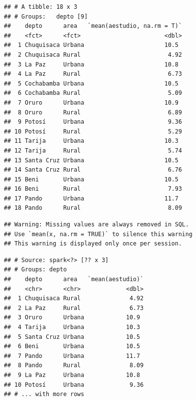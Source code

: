 \documentclass[
]{article}
\newenvironment{Shaded}{\begin{snugshade}}{\end{snugshade}}
\newcommand{\CommentTok}[1]{\textcolor[rgb]{0.56,0.35,0.01}{\textit{#1}}}
\newcommand{\KeywordTok}[1]{\textcolor[rgb]{0.13,0.29,0.53}{\textbf{#1}}}
\newcommand{\NormalTok}[1]{#1}
\newcommand{\OperatorTok}[1]{\textcolor[rgb]{0.81,0.36,0.00}{\textbf{#1}}}
\newcommand{\StringTok}[1]{\textcolor[rgb]{0.31,0.60,0.02}{#1}}
\begin{document}
\begin{verbatim}
## # A tibble: 18 x 3
## # Groups:   depto [9]
##    depto      area   `mean(aestudio, na.rm = T)`
##    <fct>      <fct>                        <dbl>
##  1 Chuquisaca Urbana                       10.5 
##  2 Chuquisaca Rural                         4.92
##  3 La Paz     Urbana                       10.8 
##  4 La Paz     Rural                         6.73
##  5 Cochabamba Urbana                       10.5 
##  6 Cochabamba Rural                         5.09
##  7 Oruro      Urbana                       10.9 
##  8 Oruro      Rural                         6.89
##  9 Potosí     Urbana                        9.36
## 10 Potosí     Rural                         5.29
## 11 Tarija     Urbana                       10.3 
## 12 Tarija     Rural                         5.74
## 13 Santa Cruz Urbana                       10.5 
## 14 Santa Cruz Rural                         6.76
## 15 Beni       Urbana                       10.5 
## 16 Beni       Rural                         7.93
## 17 Pando      Urbana                       11.7 
## 18 Pando      Rural                         8.09
\end{verbatim}

\begin{Shaded}
\end{Shaded}

\begin{verbatim}
## Warning: Missing values are always removed in SQL.
## Use `mean(x, na.rm = TRUE)` to silence this warning
## This warning is displayed only once per session.
\end{verbatim}

\begin{verbatim}
## # Source: spark<?> [?? x 3]
## # Groups: depto
##    depto      area   `mean(aestudio)`
##    <chr>      <chr>             <dbl>
##  1 Chuquisaca Rural              4.92
##  2 La Paz     Rural              6.73
##  3 Oruro      Urbana            10.9 
##  4 Tarija     Urbana            10.3 
##  5 Santa Cruz Urbana            10.5 
##  6 Beni       Urbana            10.5 
##  7 Pando      Urbana            11.7 
##  8 Pando      Rural              8.09
##  9 La Paz     Urbana            10.8 
## 10 Potosí     Urbana             9.36
## # ... with more rows
\end{verbatim}
\end{document}
